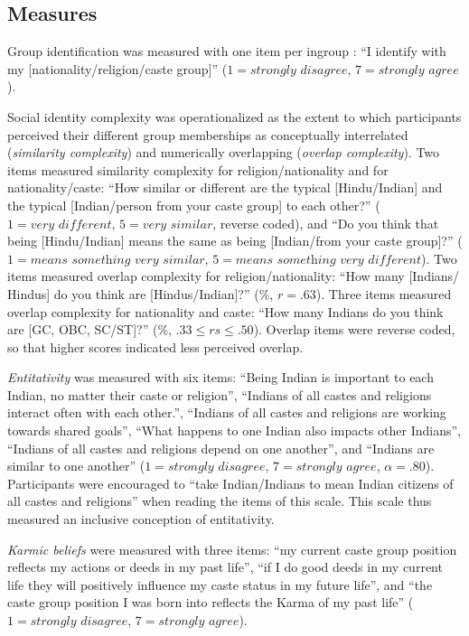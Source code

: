 \documentclass[12pt, a4paper]{article}
\begin{document}
\subsection{Measures}

Group identification was measured with one item per ingroup \cite{postmes_single_2013}: ``I identify with my [nationality/religion/caste group]'' ($1 = \textit{strongly disagree}$, $7 = \textit{strongly agree}$).

Social identity complexity \cite{roccas_social_2002, schmid_antecedents_2009} was operationalized as the extent to which participants perceived their different group memberships as conceptually interrelated (\emph{similarity complexity}) and numerically overlapping (\emph{overlap complexity}). Two items measured similarity complexity for religion/nationality and for nationality/caste: ``How similar or different are the typical [Hindu/Indian] and the typical [Indian/person from your caste group] to each other?'' ($1 = \textit{very different}$, $5 = \textit{very similar}$, reverse coded), and ``Do you think that being [Hindu/Indian] means the same as being [Indian/from your caste group]?'' ($1 = \textit{means something very similar}$, $5 = \textit{means something very different}$).  Two items measured overlap complexity for religion/nationality: ``How many [Indians/ Hindus] do you think are [Hindus/Indian]?” (\%, $r = .63$). Three items measured overlap complexity for nationality and caste: ``How many Indians do you think are [GC, OBC, SC/ST]?'' (\%, $.33 \leq rs \leq .50$). Overlap items were reverse coded, so that higher scores indicated less perceived overlap.

\emph{Entitativity} \cite{lickel_varieties_2000} was measured with six items: ``Being Indian is important to each Indian, no matter their caste or religion'', ``Indians of all castes and religions interact often with each other.'', ``Indians of all castes and religions are working towards shared goals'', ``What happens to one Indian also impacts other Indians'', ``Indians of all castes and religions depend on one another'', and ``Indians are similar to one another'' ($1 = \textit{strongly disagree}$, $7 = \textit{strongly agree}$, $\alpha = .80$). Participants were encouraged to ``take Indian/Indians to mean Indian citizens of all castes and religions'' when reading the items of this scale. This scale thus measured an inclusive conception of entitativity.

\emph{Karmic beliefs} \cite{cotterill_ideological_2014} were measured with three items: ``my current caste group position reflects
my actions or deeds in my past life'', ``if I do good deeds in my current life they will positively influence my caste status in my future life'', and ``the caste group position I was born into reflects the Karma of my past life'' ($1 = \textit{strongly disagree}$, $7 = \textit{strongly agree}$).
\end{document}
